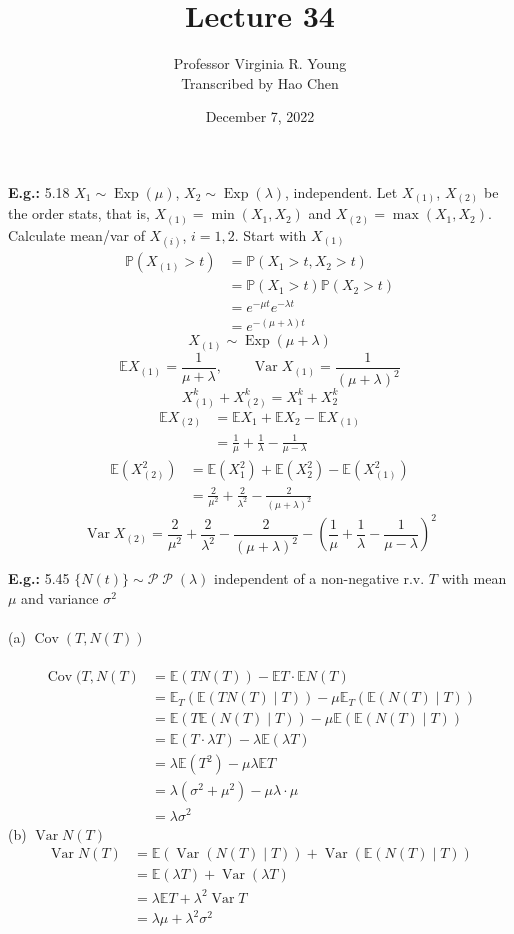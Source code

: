 \documentclass[a4paper]{article}
\title{Lecture 34}
\author{Professor Virginia R. Young\\ \small{Transcribed by Hao Chen}}
\date{December 7, 2022}
\newcommand{\n}{\hfill\break}
\newcommand{\eg}[1]{\par\noindent\settowidth{\hangindent}{\textbf{E.g.: }}\textbf{E.g.: }#1\n}
\newcommand{\Prob}{\mathbb{P}}
\renewcommand{\P}{\Prob}
\newcommand{\Avg}{\mathbb{E}}
\newcommand{\E}{\Avg}
\DeclareMathOperator{\Var}{Var}
\DeclareMathOperator{\Cov}{Cov}
\DeclareMathOperator{\Poiss}{\mathcal{P}}
\DeclareMathOperator{\Exp}{\text{Exp}}
\begin{document}
\maketitle

\eg{
5.18 $X_1\sim\Exp(\mu)$, $X_2\sim\Exp(\lambda)$, independent. Let $X_{(1)}$, $X_{(2)}$ be the order stats, that is, $X_{(1)}=\min(X_1, X_2)$ and $X_{(2)}=\max(X_1, X_2)$. Calculate mean/var of $X_{(i)}$, $i=1, 2$. Start with $X_{(1)}$
\begin{align*}
    \P(X_{(1)}>t)&=\P(X_1>t, X_2>t) \\
    &=\P(X_1>t)\P(X_2>t) \\
    &=e^{-\mu t}e^{-\lambda t} \\
    &=e^{-(\mu+\lambda)t}
\end{align*}
\[X_{(1)}\sim\Exp(\mu+\lambda)\]
\[\E X_{(1)}=\frac{1}{\mu+\lambda}, \qquad \Var X_{(1)}=\frac{1}{(\mu+\lambda)^2}\]
\[X_{(1)}^k+X_{(2)}^k=X_1^k+X_2^k\]
\begin{align*}
    \E X_{(2)}&=\E X_1+\E X_2-\E X_{(1)} \\
    &=\frac{1}{\mu}+\frac{1}{\lambda}-\frac{1}{\mu-\lambda}
\end{align*}
\begin{align*}
    \E(X_{(2)}^2)&=\E(X_1^2)+\E(X_2^2)-\E(X_{(1)}^2) \\
    &=\frac{2}{\mu^2}+\frac{2}{\lambda^2}-\frac{2}{(\mu+\lambda)^2}
\end{align*}
\[\Var X_{(2)}=\frac{2}{\mu^2}+\frac{2}{\lambda^2}-\frac{2}{(\mu+\lambda)^2}-\left(\frac{1}{\mu}+\frac{1}{\lambda}-\frac{1}{\mu-\lambda}\right)^2\]
}

\eg{
5.45 $\{N(t)\}\sim\mathcal{P}\Poiss(\lambda)$ independent of a non-negative r.v. $T$ with mean $\mu$ and variance $\sigma^2$
\\\\
(a) $\Cov(T, N(T))$
\\\\
\begin{align*}
    \Cov(T, N(T) &= \E(T N(T))-\E T\cdot \E N(T) \\
    &=\E_T(\E(T N(T)\mid T))-\mu \E_T(\E(N(T)\mid T)) \\
    &=\E(T\E(N(T)\mid T))-\mu\E(\E(N(T)\mid T)) \\
    &=\E(T\cdot \lambda T)-\lambda\E(\lambda T) \\
    &=\lambda\E(T^2)-\mu\lambda\E T \\
    &=\lambda(\sigma^2+\mu^2)-\mu\lambda\cdot\mu \\
    &=\lambda\sigma^2
\end{align*}
(b) $\Var N(T)$
\begin{align*}
    \Var N(T) &= \E(\Var(N(T)\mid T))+\Var(\E(N(T)\mid T)) \\
    &=\E(\lambda T)+\Var(\lambda T) \\
    &=\lambda\E T+\lambda^2\Var T \\
    &=\lambda\mu+\lambda^2\sigma^2
\end{align*}
}
\end{document}
